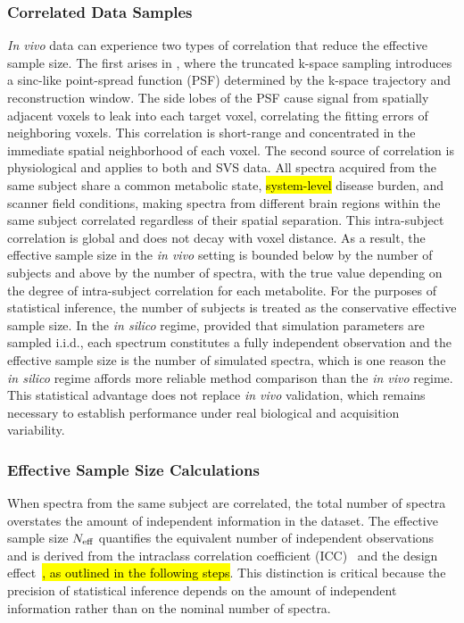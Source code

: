 \subsubsection{Correlated Data Samples}
\label{sec:5:subsec:correlated samples}
\textit{In vivo} \MRS data can experience two types of correlation that reduce the effective sample size. The first arises in \MRSI, where the truncated k-space sampling introduces a sinc-like point-spread function (PSF) determined by the k-space trajectory and reconstruction window. The side lobes of the PSF cause signal from spatially adjacent voxels to leak into each target voxel, correlating the fitting errors of neighboring voxels. This correlation is short-range and concentrated in the immediate spatial neighborhood of each voxel. The second source of correlation is physiological and applies to both \MRSI and SVS data. All spectra acquired from the same subject share a common metabolic state, \hl{system-level} disease burden, and scanner field conditions, making spectra from different brain regions within the same subject correlated regardless of their spatial separation. This intra-subject correlation is global and does not decay with voxel distance. As a result, the effective sample size in the \textit{in vivo} setting is bounded below by the number of subjects and above by the number of spectra, with the true value depending on the degree of intra-subject correlation for each metabolite. For the purposes of statistical inference, the number of subjects is treated as the conservative effective sample size. In the \textit{in silico} regime, provided that simulation parameters are sampled i.i.d., each spectrum constitutes a fully independent observation and the effective sample size is the number of simulated spectra, which is one reason the \textit{in silico} regime affords more reliable method comparison than the \textit{in vivo} regime. This statistical advantage does not replace \textit{in vivo} validation, which remains necessary to establish performance under real biological and acquisition variability. 

\subsubsection{Effective Sample Size Calculations}
\label{subsubsec:effective_sample_size}
When spectra from the same subject are correlated, the total number of spectra overstates the amount of independent information in the dataset. The effective sample size $N_{\textnormal{eff}}$ quantifies the equivalent number of independent observations and is derived from the intraclass correlation coefficient (ICC)~\cite{Shrout1979} and the design effect~\cite{Kish1965}\hl{, as outlined in the following steps}. This distinction is critical because the precision of statistical inference depends on the amount of independent information rather than on the nominal number of spectra.

